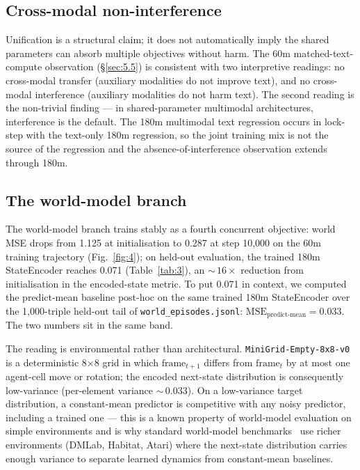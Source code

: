 \subsection{Cross-modal non-interference}\label{sec:6.2}

Unification is a structural claim; it does not automatically imply the shared parameters can absorb multiple objectives without harm. The 60m matched-text-compute observation (\S\ref{sec:5.5}) is consistent with two interpretive readings: no cross-modal transfer (auxiliary modalities do not improve text), and no cross-modal interference (auxiliary modalities do not harm text). The second reading is the non-trivial finding --- in shared-parameter multimodal architectures, interference is the default. The 180m multimodal text regression occurs in lock-step with the text-only 180m regression, so the joint training mix is not the source of the regression and the absence-of-interference observation extends through 180m.

\subsection{The world-model branch}\label{sec:6.3}

The world-model branch trains stably as a fourth concurrent objective: world MSE drops from 1.125 at initialisation to 0.287 at step 10,000 on the 60m training trajectory (Fig.~\ref{fig:4}); on held-out evaluation, the trained 180m StateEncoder reaches 0.071 (Table~\ref{tab:3}), an ${\sim}\,16\times$ reduction from initialisation in the encoded-state metric. To put 0.071 in context, we computed the predict-mean baseline post-hoc on the same trained 180m StateEncoder over the 1,000-triple held-out tail of \texttt{world\_episodes.jsonl}: $\mathrm{MSE}_{\text{predict-mean}} = 0.033$. The two numbers sit in the same band.

The reading is environmental rather than architectural. \texttt{MiniGrid-Empty-8x8-v0} is a deterministic 8$\times$8 grid in which $\mathrm{frame}_{t+1}$ differs from $\mathrm{frame}_t$ by at most one agent-cell move or rotation; the encoded next-state distribution is consequently low-variance (per-element variance ${\sim}\,0.033$). On a low-variance target distribution, a constant-mean predictor is competitive with any noisy predictor, including a trained one --- this is a known property of world-model evaluation on simple environments and is why standard world-model benchmarks~\cite{ref14,ref15} use richer environments (DMLab, Habitat, Atari) where the next-state distribution carries enough variance to separate learned dynamics from constant-mean baselines.


